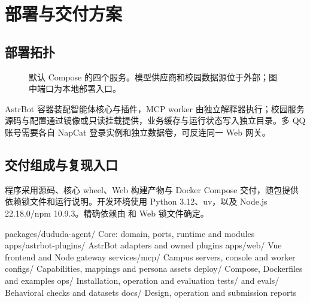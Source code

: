 \clearpage
\section{部署与交付方案}
\label{sec:deployment}
\subsection{部署拓扑}
\begin{figure}[H]\centering
{}
\caption{默认 Compose 的四个服务。模型供应商和校园数据源位于外部；图中端口为本地部署入口。}
\end{figure}

AstrBot 容器装配智能体核心与插件，MCP worker 由独立解释器执行；校园服务源码与配置通过镜像或只读挂载提供，业务缓存与运行状态写入独立目录。多 QQ 账号需要各自 NapCat 登录实例和独立数据卷，可反连同一 Web 网关。

\subsection{交付组成与复现入口}
程序采用源码、核心 wheel、Web 构建产物与 Docker Compose 交付，随包提供依赖锁文件和运行说明。开发环境使用 Python 3.12、uv，以及 Node.js 22.18.0/npm 10.9.3。精确依赖由  和 Web 锁文件确定。

\begin{Code}
packages/dududa-agent/   Core: domain, ports, runtime and modules
apps/astrbot-plugins/    AstrBot adapters and owned plugins
apps/web/               Vue frontend and Node gateway
services/mcp/           Campus servers, console and worker
configs/                Capabilities, mappings and persona assets
deploy/                 Compose, Dockerfiles and examples
ops/                    Installation, operation and evaluation
tests/ and evals/       Behavioral checks and datasets
docs/                   Design, operation and submission reports
\end{Code}

